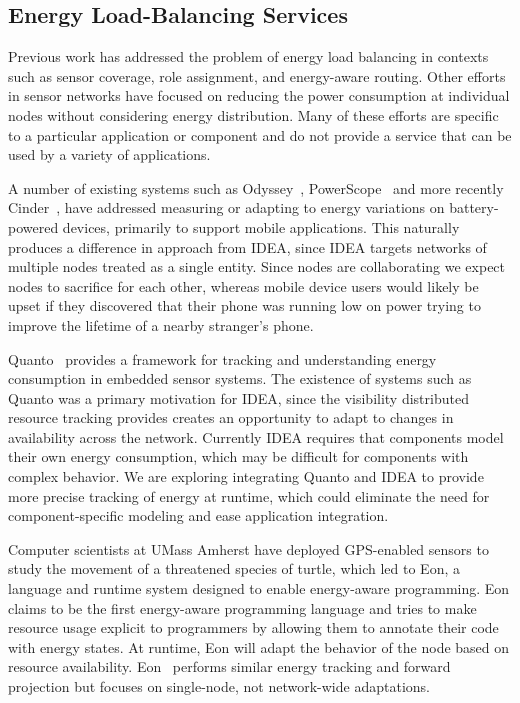 \subsection{Energy Load-Balancing Services}
\label{idea-sec-related}

Previous work has addressed the problem of energy load balancing in contexts
such as sensor coverage, role assignment, and energy-aware routing. Other
efforts in sensor networks have focused on reducing the power consumption at
individual nodes without considering energy distribution. Many of these
efforts are specific to a particular application or component and do not
provide a service that can be used by a variety of applications. 

A number of existing systems such as Odyssey~\cite{odyssey-osr99},
PowerScope~\cite{powerscope-wmcsa99} and more recently
Cinder~\cite{cinder-mobiheld09}, have addressed measuring or adapting to
energy variations on battery-powered devices, primarily to support mobile
applications. This naturally produces a difference in approach from IDEA,
since IDEA targets networks of multiple nodes treated as a single entity.
Since nodes are collaborating we expect nodes to sacrifice for each other,
whereas mobile device users would likely be upset if they discovered that
their phone was running low on power trying to improve the lifetime of a
nearby stranger's phone.

Quanto~\cite{quanto-osdi08} provides a framework for tracking and
understanding energy consumption in embedded sensor systems. The existence of
systems such as Quanto was a primary motivation for IDEA, since the
visibility distributed resource tracking provides creates an opportunity to
adapt to changes in availability across the network. Currently IDEA requires
that components model their own energy consumption, which may be difficult
for components with complex behavior. We are exploring integrating Quanto and
IDEA to provide more precise tracking of energy at runtime, which could
eliminate the need for component-specific modeling and ease application
integration.

Computer scientists at UMass Amherst have deployed GPS-enabled sensors to
study the movement of a threatened species of turtle, which led to Eon, a
language and runtime system designed to enable energy-aware programming. Eon
claims to be the first energy-aware programming language and tries to make
resource usage explicit to programmers by allowing them to annotate their
code with energy states. At runtime, Eon will adapt the behavior of the node
based on resource availability. Eon~\cite{eon-sensys07} performs similar
energy tracking and forward projection but focuses on single-node, not
network-wide adaptations.

